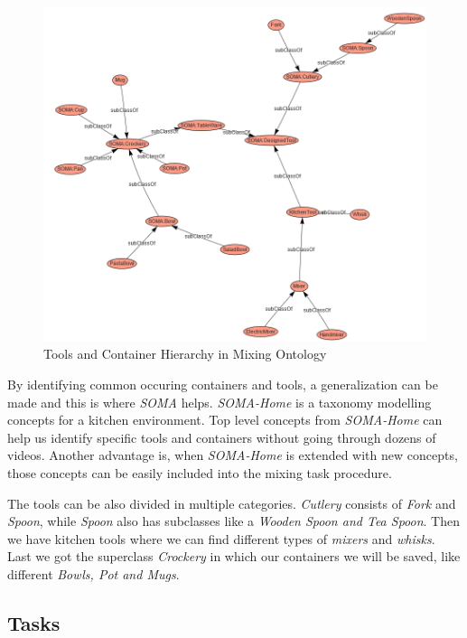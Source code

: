 \begin{figure}[H]
    \includegraphics[scale=0.45]{Graphics/classHierarchy/tools_hierarchy.png}
    \centering
    \caption{Tools and Container Hierarchy in Mixing Ontology}
\end{figure}

By identifying common occuring containers and tools, 
a generalization can be made and this is where \textit{SOMA} helps. \textit{SOMA-Home} is a taxonomy modelling concepts for a kitchen environment.
Top level concepts from \textit{SOMA-Home} can help us identify specific tools and containers without going through dozens of videos. 
Another advantage is, when \textit{SOMA-Home} is extended with new concepts, those concepts can be easily included into the mixing task procedure. 

The tools can be also divided in multiple categories. \textit{Cutlery} consists of \textit{Fork} and \textit{Spoon}, while \textit{Spoon} also has subclasses like a \textit{Wooden Spoon and Tea Spoon}.
Then we have kitchen tools where we can find different types of \textit{mixers} and \textit{whisks}. Last we got the superclass \textit{Crockery} in which our containers we will be saved, like different \textit{Bowls, Pot and Mugs}.

\subsection{Tasks}

